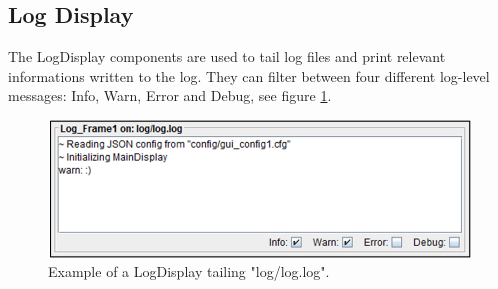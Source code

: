 \subsection{Log Display}
The LogDisplay components are used to tail log files and print relevant informations written to the log. They can filter between four different log-level messages: Info, Warn, Error and Debug, see figure \ref{fig:log}.

\begin{figure} [h]
\centering
\includegraphics [scale=0.7] {images/log}
\caption{Example of a LogDisplay tailing "log/log.log".}
\label{fig:log}
\end{figure}